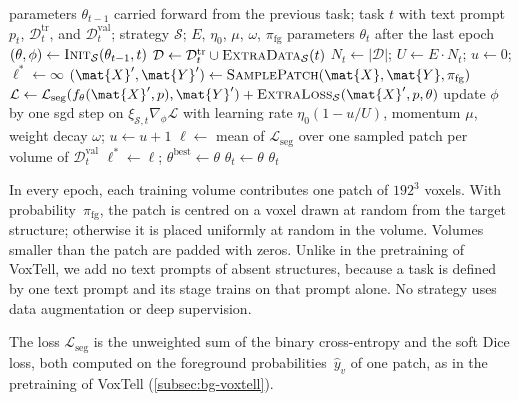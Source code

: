 \begin{algorithm}[tb]
\caption{\textsc{Adapt}: adapting VoxTell to task~$t$. The steps with subscript~$\mathcal{S}$ are where the strategies differ (\cref{sec:method-strategies}).}
\label{alg:adapt}
\begin{algorithmic}[1]
\REQUIRE parameters $\theta_{t-1}$ carried forward from the previous task; task $t$ with text prompt $p_t$, $\mathcal{D}_t^{\mathrm{tr}}$, and $\mathcal{D}_t^{\mathrm{val}}$; strategy $\mathcal{S}$; $E$, $\eta_0$, $\mu$, $\omega$, $\pi_{\mathrm{fg}}$
\ENSURE parameters $\theta_t$ after the last epoch
\STATE $(\theta, \phi) \gets \textsc{Init}_{\mathcal{S}}(\theta_{t-1}, t)$ 
\STATE $\mathcal{D} \gets \mathcal{D}_t^{\mathrm{tr}} \cup \textsc{ExtraData}_{\mathcal{S}}(t)$
\STATE $N_t \gets |\mathcal{D}|$; \quad $U \gets E \cdot N_t$; \quad $u \gets 0$; \quad $\ell^{*} \gets \infty$
    \STATE $(\mat{X}', \mat{Y}') \gets \textsc{SamplePatch}(\mat{X}, \mat{Y}, \pi_{\mathrm{fg}})$
    \STATE $\mathcal{L} \gets \mathcal{L}_{\mathrm{seg}}(f_\theta(\mat{X}', p), \mat{Y}') + \textsc{ExtraLoss}_{\mathcal{S}}(\mat{X}', p, \theta)$
    \STATE update $\phi$ by one \gls{sgd} step on $\xi_{\mathcal{S},t} \nabla_\phi \mathcal{L}$ with learning rate $\eta_0 (1 - u/U)$, momentum $\mu$, weight decay $\omega$; \quad $u \gets u + 1$
  \ENDFOR
  \STATE $\ell \gets$ mean of $\mathcal{L}_{\mathrm{seg}}$ over one sampled patch per volume of $\mathcal{D}_t^{\mathrm{val}}$
  \IF{$\ell < \ell^{*}$}
    \STATE $\ell^{*} \gets \ell$; \quad $\theta^{\mathrm{best}} \gets \theta$
  \ENDIF
\ENDFOR
\STATE $\theta_t \gets \theta$ 
\RETURN $\theta_t$
\end{algorithmic}
\end{algorithm}

In every epoch, each training volume contributes one patch of $192^3$ voxels.
With probability~$\pi_{\mathrm{fg}}$, the patch is centred on a voxel drawn at random from the target structure; otherwise it is placed uniformly at random in the volume.
Volumes smaller than the patch are padded with zeros.
Unlike in the pretraining of VoxTell, we add no text prompts of absent structures, because a task is defined by one text prompt and its stage trains on that prompt alone.
No strategy uses data augmentation or deep supervision.

The loss $\mathcal{L}_{\mathrm{seg}}$ is the unweighted sum of the binary cross-entropy and the soft Dice loss, both computed on the foreground probabilities~$\hat{y}_v$ of one patch, as in the pretraining of VoxTell (\cref{subsec:bg-voxtell}).

